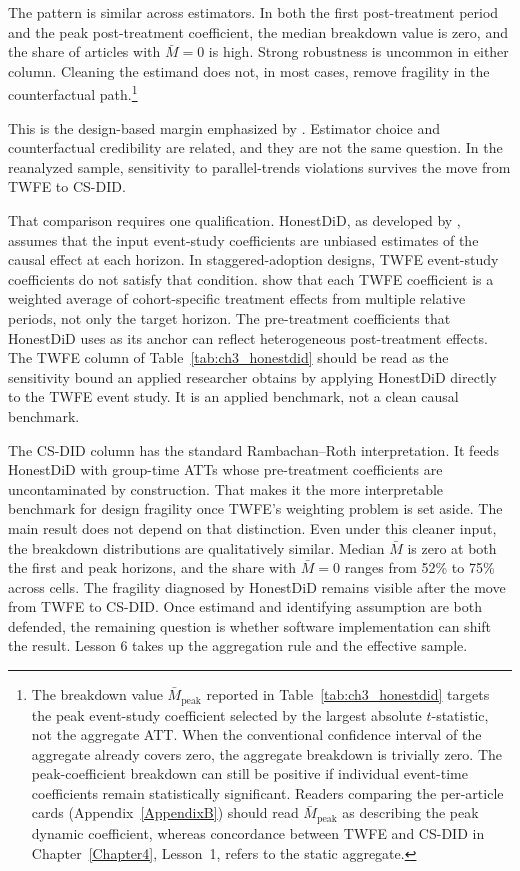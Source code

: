 \documentclass[11pt]{article}
\begin{document}
The pattern is similar across estimators. In both the first post-treatment period and the peak post-treatment coefficient, the median breakdown value is zero, and the share of articles with $\bar M = 0$ is high. Strong robustness is uncommon in either column. Cleaning the estimand does not, in most cases, remove fragility in the counterfactual path.\footnote{The breakdown value $\bar{M}_{\text{peak}}$ reported in Table~\ref{tab:ch3_honestdid} targets the peak event-study coefficient selected by the largest absolute $t$-statistic, not the aggregate ATT. When the conventional confidence interval of the aggregate already covers zero, the aggregate breakdown is trivially zero. The peak-coefficient breakdown can still be positive if individual event-time coefficients remain statistically significant. Readers comparing the per-article cards (Appendix~\ref{AppendixB}) should read $\bar{M}_{\text{peak}}$ as describing the peak dynamic coefficient, whereas concordance between TWFE and CS-DID in Chapter~\ref{Chapter4}, Lesson~1, refers to the static aggregate.}

This is the design-based margin emphasized by \textcite{baker2025difference}. Estimator choice and counterfactual credibility are related, and they are not the same question. In the reanalyzed sample, sensitivity to parallel-trends violations survives the move from TWFE to CS-DID.

That comparison requires one qualification. HonestDiD, as developed by \textcite{rambachan2023more}, assumes that the input event-study coefficients are unbiased estimates of the causal effect at each horizon. In staggered-adoption designs, TWFE event-study coefficients do not satisfy that condition. \textcite{sun2021estimating} show that each TWFE coefficient is a weighted average of cohort-specific treatment effects from multiple relative periods, not only the target horizon. The pre-treatment coefficients that HonestDiD uses as its anchor can reflect heterogeneous post-treatment effects. The TWFE column of Table~\ref{tab:ch3_honestdid} should be read as the sensitivity bound an applied researcher obtains by applying HonestDiD directly to the TWFE event study. It is an applied benchmark, not a clean causal benchmark.

The CS-DID column has the standard Rambachan--Roth interpretation. It feeds HonestDiD with group-time ATTs whose pre-treatment coefficients are uncontaminated by construction. That makes it the more interpretable benchmark for design fragility once TWFE's weighting problem is set aside. The main result does not depend on that distinction. Even under this cleaner input, the breakdown distributions are qualitatively similar. Median $\bar M$ is zero at both the first and peak horizons, and the share with $\bar M = 0$ ranges from 52\% to 75\% across cells. The fragility diagnosed by HonestDiD remains visible after the move from TWFE to CS-DID. Once estimand and identifying assumption are both defended, the remaining question is whether software implementation can shift the result. Lesson 6 takes up the aggregation rule and the effective sample.
\end{document}
